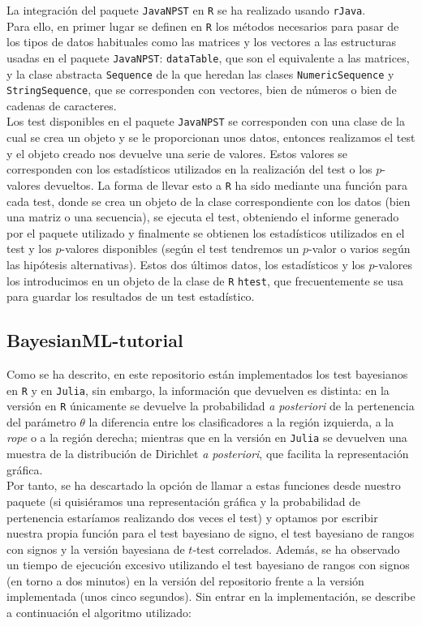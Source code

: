	La integración del paquete \texttt{JavaNPST} en
\texttt{R} se ha realizado usando \texttt{rJava}.\\
Para ello, en primer lugar se definen en \texttt{R} los 
métodos necesarios para pasar de los tipos de datos 
habituales como las matrices y los vectores a las estructuras 
usadas en el paquete  \texttt{JavaNPST}: \texttt{dataTable}, 
que son el equivalente a las matrices, y la clase abstracta 
\texttt{Sequence}  de la que heredan las clases 
\texttt{NumericSequence} y \texttt{StringSequence}, que se 
corresponden con vectores, bien de números o bien de cadenas 
de caracteres.\\
	Los test disponibles en el paquete \texttt{JavaNPST} 
se corresponden con una clase de la cual se crea un 
objeto y se le proporcionan unos datos, entonces realizamos
el test y el objeto creado nos devuelve una serie de valores.
Estos valores se corresponden con los estadísticos utilizados
en la realización del test o los $p$-valores devueltos.
La forma de llevar esto a \texttt{R} ha sido mediante
una función para cada test, donde se crea un objeto
de la clase correspondiente con los datos (bien una matriz
o una secuencia), se ejecuta el test, obteniendo el informe
generado por el paquete utilizado y finalmente se obtienen 
los estadísticos utilizados en el test y los $p$-valores
disponibles (según el test tendremos un $p$-valor o 
varios según las hipótesis alternativas). Estos dos últimos
datos, los estadísticos y los $p$-valores los introducimos
en un objeto de la clase de \texttt{R} \texttt{htest},
que frecuentemente se usa para guardar los resultados de un
test estadístico.

\subsection*{BayesianML-tutorial}

	Como se ha descrito, en este repositorio están
implementados los test bayesianos en \texttt{R}
y en \texttt{Julia}, sin embargo, la información
que devuelven es distinta: en la versión en \texttt{R}
únicamente se devuelve la probabilidad \textit{a
posteriori} de la pertenencia del parámetro 
$\theta$ la diferencia entre los clasificadores
a la región izquierda, a la \textit{rope} o a la
región derecha; mientras que en la versión en
\texttt{Julia} se devuelven una muestra de 
la distribución de Dirichlet \textit{a posteriori},
que facilita la representación gráfica.\\
Por tanto, se ha descartado la opción de 
llamar a estas funciones desde nuestro paquete
(si quisiéramos una representación gráfica
y la probabilidad de pertenencia estaríamos
realizando dos veces el test) y optamos por
escribir nuestra propia función para el
test bayesiano de signo, el test bayesiano de 
rangos con signos y la versión bayesiana 
de $t$-test correlados. Además, se ha observado 						%
un tiempo de ejecución excesivo utilizando
el test bayesiano de rangos con signos (en torno
a dos minutos) en la versión del repositorio
frente a la versión implementada (unos cinco
segundos). Sin entrar en la implementación, se 
describe a continuación el algoritmo utilizado:

